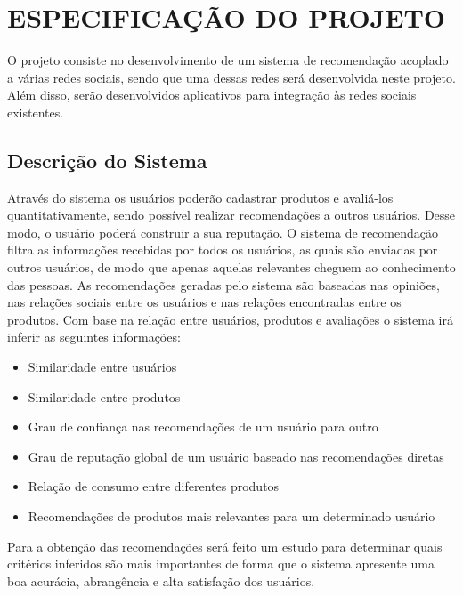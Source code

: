 \chapter{ESPECIFICAÇÃO DO PROJETO} %
\label{cha:especificacao_do_projeto}

 O projeto consiste no desenvolvimento de um sistema de recomendação acoplado a várias redes sociais, sendo que uma dessas redes será desenvolvida neste projeto. Além disso, serão desenvolvidos aplicativos para integração às redes sociais existentes.


\section{Descrição do Sistema}

 Através do sistema os usuários poderão cadastrar produtos e avaliá-los quantitativamente, sendo possível realizar recomendações a outros usuários. Desse modo, o usuário poderá construir a sua reputação. O sistema de recomendação filtra as informações recebidas por todos os usuários, as quais são enviadas por outros usuários, de modo que apenas aquelas relevantes cheguem ao conhecimento das pessoas. As recomendações geradas pelo sistema são baseadas nas opiniões, nas relações sociais entre os usuários e nas relações encontradas entre os produtos. Com base na relação entre usuários, produtos e avaliações o sistema irá inferir as seguintes informações:
\begin{itemize}

 \item Similaridade entre usuários

 \item Similaridade entre produtos

 \item Grau de confiança nas recomendações de um usuário para outro

 \item Grau de reputação global de um usuário baseado nas recomendações diretas

 \item Relação de consumo entre diferentes produtos

 \item Recomendações de produtos mais relevantes para um determinado usuário

\end{itemize}

 Para a obtenção das recomendações será feito um estudo para determinar quais critérios inferidos são mais importantes de forma que o sistema apresente uma boa acurácia, abrangência e alta satisfação dos usuários.

